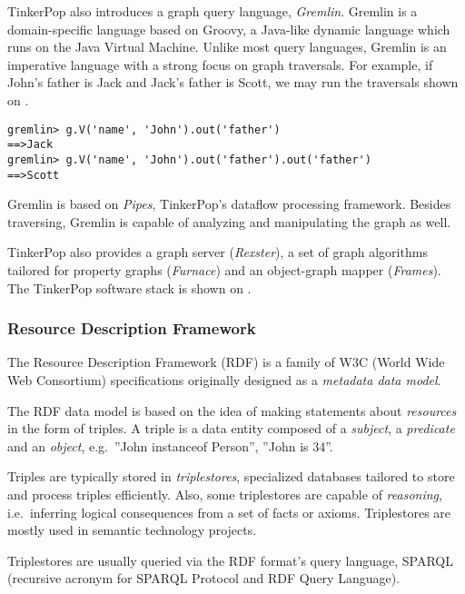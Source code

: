  
TinkerPop also introduces a graph query language, \textit{Gremlin}. Gremlin is a domain-specific language based on Groovy, a Java-like dynamic language which runs on the Java Virtual Machine. Unlike most query languages, Gremlin is an imperative language with a strong focus on graph traversals. For example, if John's father is Jack and Jack's father is Scott, we may run the traversals shown on .

\begin{lstlisting}[caption=Simple Gremlin queries, label=lst:gremlin-queries]
gremlin> g.V('name', 'John').out('father')
==>Jack
gremlin> g.V('name', 'John').out('father').out('father')
==>Scott
\end{lstlisting}

Gremlin is based on \textit{Pipes}, TinkerPop's dataflow processing framework. Besides traversing, Gremlin is capable of analyzing and manipulating the graph as well.

TinkerPop also provides a graph server (\textit{Rexster}), a set of graph algorithms tailored for property graphs (\textit{Furnace}) and an object-graph mapper (\textit{Frames}). The TinkerPop software stack is shown on .

\subsubsection{Resource Description Framework}

The Resource Description Framework (RDF) is a family of W3C (World Wide Web Consortium) specifications originally designed as a \emph{metadata data model}. 

The RDF data model is based on the idea of making statements about \emph{resources} in the form of triples. A triple is a data entity composed of a \emph{subject}, a \emph{predicate} and an \emph{object}, e.g.\ ''John instanceof Person'', ''John is 34''.  

Triples are typically stored in \emph{triplestores}, specialized databases tailored to store and process triples efficiently. Also, some triplestores are capable of \emph{reasoning}, i.e.\ inferring logical consequences from a set of facts or axioms. Triplestores are mostly used in semantic technology projects.

Triplestores are usually queried via the RDF format's query language, SPARQL (recursive acronym for SPARQL Protocol and RDF Query Language). 

